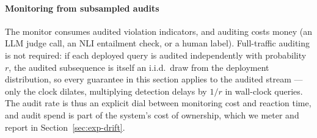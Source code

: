 \paragraph{Monitoring from subsampled audits}
The monitor consumes audited violation indicators, and auditing costs
money (an LLM judge call, an NLI entailment check, or a human label).
Full-traffic auditing is not required: if each deployed query is
audited independently with probability $r$, the audited subsequence is
itself an i.i.d.\ draw from the deployment distribution, so every
guarantee in this section applies to the audited stream ---
only the clock dilates, multiplying detection delays by $1/r$ in
wall-clock queries. The audit rate is thus an explicit dial between
monitoring cost and reaction time, and audit spend is part of the
system's cost of ownership, which we meter and report in
Section~\ref{sec:exp-drift}.
